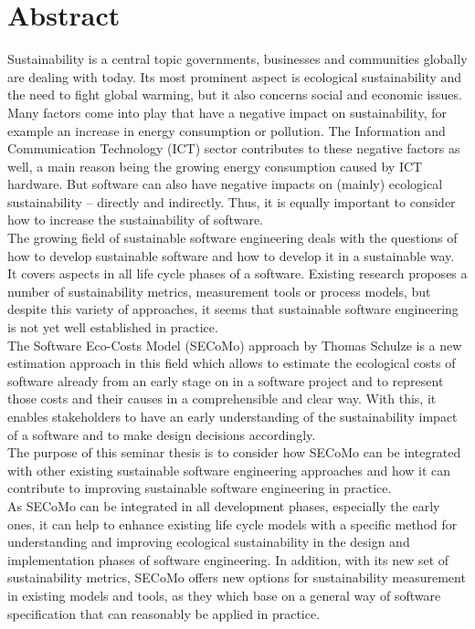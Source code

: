 \chapter{Abstract}
Sustainability is a central topic governments, businesses and communities globally are dealing with today. Its most prominent aspect is ecological sustainability and the need to fight global warming, but it also concerns social and economic issues. Many factors come into play that have a negative impact on sustainability, for example an increase in energy consumption or pollution. The Information and Communication Technology (ICT) sector contributes to these negative factors as well, a main reason being the growing energy consumption caused by ICT hardware. But software can also have negative impacts on (mainly) ecological sustainability – directly and indirectly. Thus, it is equally important to consider how to increase the sustainability of software.\\
The growing field of sustainable software engineering deals with the questions of how to develop sustainable software and how to develop it in a sustainable way. It covers aspects in all life cycle phases of a software. Existing research proposes a number of sustainability metrics, measurement tools or process models, but despite this variety of approaches, it seems that sustainable software engineering is not yet well established in practice.\\ %
The Software Eco-Costs Model (SECoMo) approach by Thomas Schulze \cite{schulze_cost_2016} is a new estimation approach in this field which allows to estimate the ecological costs of software already from an early stage on in a software project and to represent those costs and their causes in a comprehensible and clear way. With this, it enables stakeholders to have an early understanding of the sustainability impact of a software and to make design decisions accordingly. \cite{schulze_cost_2016} %
\\ %
The purpose of this seminar thesis is to consider how SECoMo can be integrated with other existing sustainable software engineering approaches and how it can contribute to improving sustainable software engineering in practice.\\
As SECoMo can be integrated in all development phases, especially the early ones, it can help to enhance existing life cycle models with a specific method for understanding and improving ecological sustainability in the design and implementation phases of software engineering. In addition, with its new set of sustainability metrics, SECoMo offers new options for sustainability measurement in existing models and tools, as they which base on a general way of software specification that can reasonably be applied in practice.